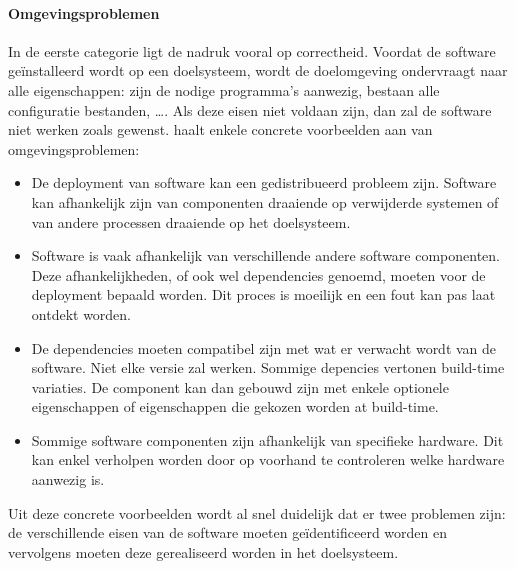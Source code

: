 \paragraph{Omgevingsproblemen}
In de eerste categorie ligt de nadruk vooral op correctheid.
Voordat de software geïnstalleerd wordt op een doelsysteem, wordt de doelomgeving ondervraagt naar alle eigenschappen: zijn de nodige programma's aanwezig, bestaan alle configuratie bestanden, \ldots .
Als deze eisen niet voldaan zijn, dan zal de software niet werken zoals gewenst.
\citet{dolstra2006purely} haalt enkele concrete voorbeelden aan van omgevingsproblemen:
\begin{itemize}
\item De deployment van software kan een gedistribueerd probleem zijn.
Software kan afhankelijk zijn van componenten draaiende op verwijderde systemen of van andere processen draaiende op het doelsysteem.  
\item Software is vaak afhankelijk van verschillende andere software componenten. 
Deze afhankelijkheden, of ook wel dependencies genoemd, moeten voor de deployment bepaald worden.
Dit proces is moeilijk en een fout kan pas laat ontdekt worden.
\item De dependencies moeten compatibel zijn met wat er verwacht wordt van de software.
Niet elke versie zal werken.
Sommige depencies vertonen build-time variaties.
De component kan dan gebouwd zijn met enkele optionele eigenschappen of eigenschappen die gekozen worden at build-time.
\item Sommige software componenten zijn afhankelijk van specifieke hardware.
Dit kan enkel verholpen worden door op voorhand te controleren welke hardware aanwezig is.
\end{itemize}

Uit deze concrete voorbeelden wordt al snel duidelijk dat er twee problemen zijn: de verschillende eisen van de software moeten geïdentificeerd worden en vervolgens moeten deze gerealiseerd worden in het doelsysteem.

